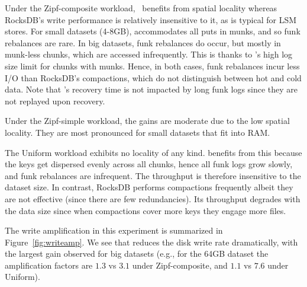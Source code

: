  Under the Zipf-composite workload, \sys\ benefits from spatial locality whereas RocksDB's write performance 
 is relatively insensitive to it, as is typical for LSM stores. For small datasets (4-8GB), \sys\/ accommodates 
all puts in munks, and so funk rebalances are rare. In big datasets, funk rebalances do occur, but mostly in 
munk-less chunks, which are accessed infrequently. This is thanks to \sys\/'s high log size limit for chunks 
with munks. Hence, in both cases, funk rebalances incur less I/O than RocksDB's compactions, 
which do not distinguish between hot and cold data. Note that \sys's recovery time is not impacted by 
long funk logs since they are not replayed upon recovery.

 Under the Zipf-simple workload, the gains are moderate due to the low spatial locality. They are most pronounced 
 for small datasets that fit into RAM.
 
The Uniform workload exhibits no locality of any kind. 
 \sys\/ benefits from this because the keys get dispersed evenly across all chunks, hence all funk logs grow 
 slowly, and funk rebalances are infrequent. The throughput is therefore insensitive to the dataset 
 size. In contrast, RocksDB performs compactions frequently albeit they are not effective (since there are few redundancies). Its throughput 
 degrades  with the data size since when compactions cover more keys they engage more files.
 
   
The write amplification in this experiment is summarized in 
Figure~\ref{fig:writeamp}. We see that \sys\/ reduces the disk write rate dramatically, 
with the largest gain observed for big datasets (e.g.,  for the 64GB dataset 
the amplification factors are $1.3$ vs $3.1$ under Zipf-composite, and $1.1$ vs $7.6$ under Uniform). 

